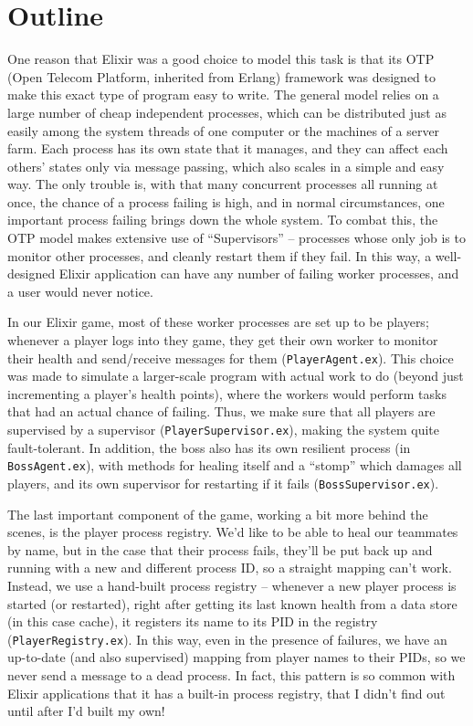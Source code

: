 \documentclass[letterpaper]{article}
\begin{document}
	\section{Outline}

	One reason that Elixir was a good choice to model this task is that its OTP (Open Telecom Platform, inherited from Erlang) framework was designed to make this exact type of program easy to write. The general model relies on a large number of cheap independent processes, which can be distributed just as easily among the system threads of one computer or the machines of a server farm. Each process has its own state that it manages, and they can affect each others' states only via message passing, which also scales in a simple and easy way. The only trouble is, with that many concurrent processes all running at once, the chance of a process failing is high, and in normal circumstances, one important process failing brings down the whole system. To combat this, the OTP model makes extensive use of ``Supervisors'' -- processes whose only job is to monitor other processes, and cleanly restart them if they fail. In this way, a well-designed Elixir application can have any number of failing worker processes, and a user would never notice.

	In our Elixir game, most of these worker processes are set up to be players; whenever a player logs into they game, they get their own worker to monitor their health and send/receive messages for them (\texttt{PlayerAgent.ex}). This choice was made to simulate a larger-scale program with actual work to do (beyond just incrementing a player's health points), where the workers would perform tasks that had an actual chance of failing. Thus, we make sure that all players are supervised by a supervisor (\texttt{PlayerSupervisor.ex}), making the system quite fault-tolerant. In addition, the boss also has its own resilient process (in \texttt{BossAgent.ex}), with methods for healing itself and a ``stomp'' which damages all players, and its own supervisor for restarting if it fails (\texttt{BossSupervisor.ex}).

	The last important component of the game, working a bit more behind the scenes, is the player process registry. We'd like to be able to heal our teammates by name, but in the case that their process fails, they'll be put back up and running with a new and different process ID, so a straight mapping can't work. Instead, we use a hand-built process registry -- whenever a new player process is started (or restarted), right after getting its last known health from a data store (in this case cache), it registers its name to its PID in the registry (\texttt{PlayerRegistry.ex}). In this way, even in the presence of failures, we have an up-to-date (and also supervised) mapping from player names to their PIDs, so we never send a message to a dead process. In fact, this pattern is so common with Elixir applications that it has a built-in process registry, that I didn't find out until after I'd built my own!
\end{document}
